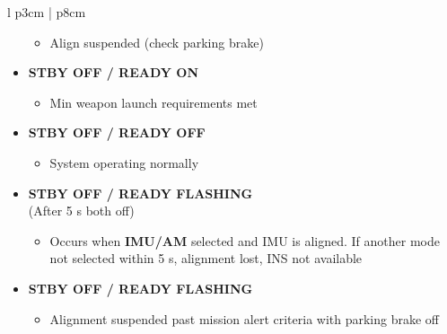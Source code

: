 \documentclass[fontHelvetica]{TechCheck}
\begin{document}
\begin{center}
\begin{longtable}{l p{3cm} | p{8cm}}
\begin{minipage}[t]{\linewidth}
\begin{itemize}
					\begin{itemize}
						\item Align suspended (check parking brake)
					\end{itemize}
					\item \textbf{STBY OFF / READY ON}
					\begin{itemize}
						\item Min weapon launch requirements met
					\end{itemize}
					\item \textbf{STBY OFF / READY OFF}
					\begin{itemize}
						\item System operating normally
					\end{itemize}
					\item \textbf{STBY OFF / READY FLASHING} \\
					(After 5 s both off)
					\begin{itemize}
						\item Occurs when \textbf{IMU/AM} selected and IMU is aligned. If another mode not selected within 5 s, alignment lost, INS not available
					\end{itemize}
					\item \textbf{STBY OFF / READY FLASHING}
					\begin{itemize}
						\item Alignment suspended past mission alert criteria with parking brake off
					\end{itemize}
				\end{itemize}
			\end{minipage} \\
			\bottomrule
		\end{longtable}
	\end{center}

	\clearpage
\end{document}
